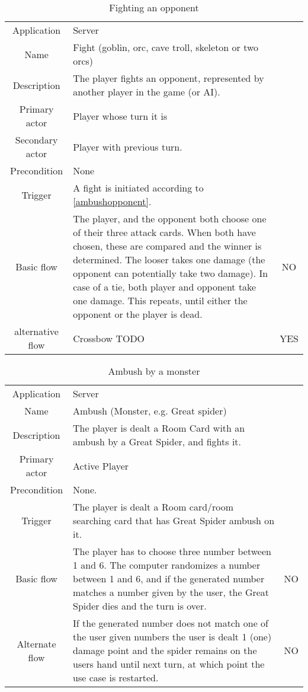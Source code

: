\documentclass[a4paper,10pt]{report}
\begin{document}
\begin{table}
\caption{Fighting an opponent}
\label{fightopponent}
\begin{tabular}{|c| p{9cm}|c}
\hline
Application & Server & \\
Name & Fight (goblin, orc, cave troll, skeleton or two orcs) & \\
Description & The player fights an opponent, represented by another player in the game (or AI). & \\
Primary actor & Player whose turn it is & \\
Secondary actor & Player with previous turn. & \\
Precondition & None & \\
Trigger & A fight is initiated according to \ref{ambushopponent}. & \\ \hline
Basic flow & The player, and the opponent both choose one of their three attack cards. When both have chosen, these are compared and the winner is determined. The looser takes one damage (the opponent can potentially take two damage). In case of a tie, both player and opponent take one damage. This repeats, until either the opponent or the player is dead. & NO\\ \hline
alternative flow & Crossbow TODO & YES\\
\hline
\end{tabular}
\end{table}

\begin{table}
\caption{Ambush by a monster}
\label{ambushmonster}
\begin{tabular}{|c| p{9cm}|c}
\hline
Application &	Server & \\
Name & Ambush (Monster, e.g. Great spider)& \\
Description&  The player is dealt a Room Card with an ambush by a Great Spider, and fights it.& \\
Primary actor & Active Player& \\
Precondition &  None.& \\
Trigger & The player is dealt a Room card/room searching card that has Great Spider ambush on it.& \\ \hline
Basic flow & The player has to choose three number between 1 and 6. The computer randomizes a number between 1 and 6, and if the generated number matches a number given by the user, the Great Spider dies and the turn is over. & NO \\ \hline
Alternate flow & If the generated number does not match one of the user given numbers the user is dealt 1 (one) damage point and the spider remains on the users hand until next turn, at which point the use case is restarted. & NO \\
\hline
\end{tabular}
\end{table}
\end{document}
